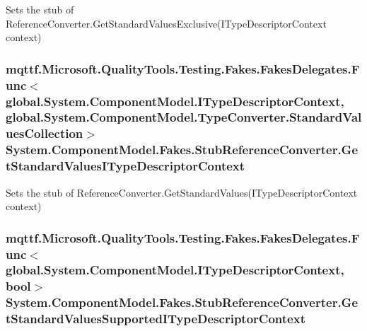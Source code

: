 Sets the stub of Reference\-Converter.\-Get\-Standard\-Values\-Exclusive(\-I\-Type\-Descriptor\-Context context)

\hypertarget{class_system_1_1_component_model_1_1_fakes_1_1_stub_reference_converter_a062fa49804762b63113b631e3c156d25}{
\subsubsection[{Get\-Standard\-Values\-I\-Type\-Descriptor\-Context}]{\setlength{\rightskip}{0pt plus 5cm}mqttf.\-Microsoft.\-Quality\-Tools.\-Testing.\-Fakes.\-Fakes\-Delegates.\-Func$<$global.\-System.\-Component\-Model.\-I\-Type\-Descriptor\-Context, global.\-System.\-Component\-Model.\-Type\-Converter.\-Standard\-Values\-Collection$>$ System.\-Component\-Model.\-Fakes.\-Stub\-Reference\-Converter.\-Get\-Standard\-Values\-I\-Type\-Descriptor\-Context}}\label{class_system_1_1_component_model_1_1_fakes_1_1_stub_reference_converter_a062fa49804762b63113b631e3c156d25}


Sets the stub of Reference\-Converter.\-Get\-Standard\-Values(\-I\-Type\-Descriptor\-Context context)

\hypertarget{class_system_1_1_component_model_1_1_fakes_1_1_stub_reference_converter_ae0fb0760aa5454d8acd846795935d4ea}{
\subsubsection[{Get\-Standard\-Values\-Supported\-I\-Type\-Descriptor\-Context}]{\setlength{\rightskip}{0pt plus 5cm}mqttf.\-Microsoft.\-Quality\-Tools.\-Testing.\-Fakes.\-Fakes\-Delegates.\-Func$<$global.\-System.\-Component\-Model.\-I\-Type\-Descriptor\-Context, bool$>$ System.\-Component\-Model.\-Fakes.\-Stub\-Reference\-Converter.\-Get\-Standard\-Values\-Supported\-I\-Type\-Descriptor\-Context}}\label{class_system_1_1_component_model_1_1_fakes_1_1_stub_reference_converter_ae0fb0760aa5454d8acd846795935d4ea}


